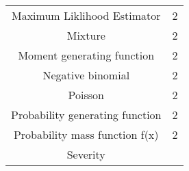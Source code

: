 \documentclass[]{book}
\theoremstyle{definition}
\theoremstyle{definition}
\theoremstyle{definition}
\theoremstyle{remark}
\begin{document}
\begin{longtable}[]{@{}cc@{}}
\begin{minipage}[t]{0.43\columnwidth}
Maximum Liklihood Estimator\strut
\end{minipage} & \begin{minipage}[t]{0.30\columnwidth}\centering\strut
2\strut
\end{minipage}\tabularnewline
\begin{minipage}[t]{0.43\columnwidth}\centering\strut
Mixture\strut
\end{minipage} & \begin{minipage}[t]{0.30\columnwidth}\centering\strut
2\strut
\end{minipage}\tabularnewline
\begin{minipage}[t]{0.43\columnwidth}\centering\strut
Moment generating function\strut
\end{minipage} & \begin{minipage}[t]{0.30\columnwidth}\centering\strut
2\strut
\end{minipage}\tabularnewline
\begin{minipage}[t]{0.43\columnwidth}\centering\strut
Negative binomial\strut
\end{minipage} & \begin{minipage}[t]{0.30\columnwidth}\centering\strut
2\strut
\end{minipage}\tabularnewline
\begin{minipage}[t]{0.43\columnwidth}\centering\strut
Poisson\strut
\end{minipage} & \begin{minipage}[t]{0.30\columnwidth}\centering\strut
2\strut
\end{minipage}\tabularnewline
\begin{minipage}[t]{0.43\columnwidth}\centering\strut
Probability generating function\strut
\end{minipage} & \begin{minipage}[t]{0.30\columnwidth}\centering\strut
2\strut
\end{minipage}\tabularnewline
\begin{minipage}[t]{0.43\columnwidth}\centering\strut
Probability mass function f(x)\strut
\end{minipage} & \begin{minipage}[t]{0.30\columnwidth}\centering\strut
2\strut
\end{minipage}\tabularnewline
\begin{minipage}[t]{0.43\columnwidth}\centering\strut
Severity\strut
\end{minipage} & \begin{minipage}[t]{0.30\columnwidth}\centering\strut

\end{minipage}
\end{longtable}
\end{document}
